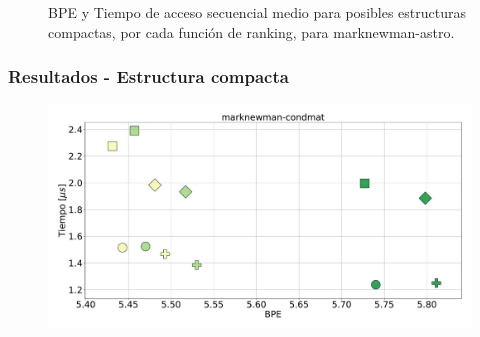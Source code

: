 \begin{frame}
\begin{figure}
	\caption{BPE y Tiempo de acceso secuencial medio para posibles estructuras compactas, por cada función de ranking, para marknewman-astro.}
\end{figure}

\end{frame}

\begin{frame}
\frametitle{Resultados - Estructura compacta}

\begin{figure}
	\centering
	
    	\begin{minipage}{1\textwidth}
    		\centering
    		\begin{minipage}{0.8\textwidth}
    			\centering
    			\includegraphics[width=1\linewidth]{../img/sdsl/secuencialBig/marknewman-condmat.pdf}
    		\end{minipage}
    		\begin{minipage}{0.15\textwidth}
    			\centering

\end{minipage}
\end{minipage}
\end{figure}
\end{frame}

